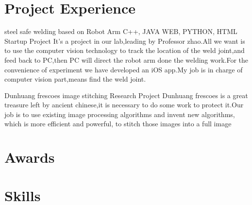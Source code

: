 \documentclass[11pt,a4paper]{moderncv}
\begin{document}


\section{Project Experience}

{steel safe welding based on Robot Arm}
{C++, JAVA WEB, PYTHON, HTML}
{Startup Project}{}
{It's a project in our lab,leading by Professor zhao.All we want is to use the computer vision technology to track the location of the weld joint,and feed back to PC,then PC will direct the robot arm done the welding work.For the convenience of experiment we have developed an iOS app.My job is in charge of computer vision part,means find the weld joint.}

\vspace*{0.2\baselineskip}
{Dunhuang frescoes image stitching}{}
{Research Project}{}
{Dunhuang frescoes is a great treasure left by ancient chinese,it is necessary to do some work to protect it.Our job is to use existing image processing algorithms and invent new algorithms, which is more efficient and powerful, to stitch those images into a full image}


\section{Awards}

\section{Skills}
\end{document}
